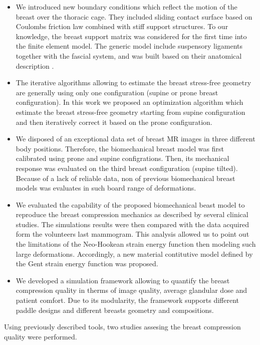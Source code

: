 \begin{itemize}
\item We introduced new boundary conditions which reflect the motion of the breast over the thoracic cage.  They included sliding contact surface based on Coulombs friction law combined with stiff support structures. To our knowledge,  the breast support matrix was considered for the first time into the finite element model. The generic model include suspensory ligaments together with the fascial system, and was built based on their anatomical description .   

\item The iterative algorithms allowing to estimate the breast stress-free  geometry are generally using only one configuration (supine or prone breast configuration). In this work we proposed an optimization algorithm which estimate the breast stress-free geometry starting from supine configuration and then iteratively correct it based on the prone configuration. 

\item  We disposed of an exceptional data set of breast MR images in three different body positions. Therefore, the biomechanical breast model was first calibrated using prone and supine configrations. Then, its mechanical response was evaluated on the third breast configuration (supine tilted). Because of a lack of reliable data, non of previous biomechanical breast models was evaluates in such board range of deformations.  

\item We evaluated the capability of the proposed biomechanical beast model to reproduce the breast compression mechanics as described by several clinical studies.  The simulations results were then compared with the data acquired form the volunteers last mammogram. This analysis allowed us to point out the limitations of the Neo-Hookean strain energy function then modeling such large deformations.  Accordingly, a new material contitutive model defined by the Gent strain energy function was proposed.


\item We developed a simulation framework allowing to quantify the breast compression quality in therms of image quality, average glandular dose and patient comfort. Due to its modularity, the framework supports different paddle designs and different breasts geometry and compositions. 
\end{itemize}

Using previously described tools, two studies assesing the breast compression quality were performed.

